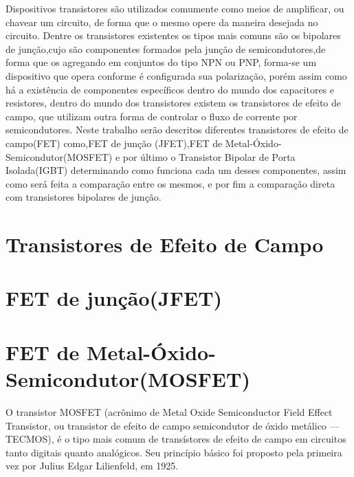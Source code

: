 \documentclass[12pt]{article}
\begin{document}
    Dispositivos transistores são utilizados comumente como meios de amplificar, ou chavear um circuito, de forma que o mesmo opere da maneira desejada no circuito. Dentre os transistores existentes os tipos mais comuns são os bipolares de junção,cujo são componentes formados pela junção de semicondutores,de forma que os agregando em conjuntos do tipo NPN ou PNP, forma-se um dispositivo que opera conforme é configurada sua polarização, porém assim como há a existência de componentes específicos dentro do mundo dos capacitores e resistores, dentro do mundo dos transistores existem os transistores de efeito de campo, que utilizam outra forma de controlar o fluxo de corrente por semicondutores. Neste trabalho serão descritos diferentes transistores de efeito de campo(FET) como,FET de junção (JFET),FET de Metal-Óxido-Semicondutor(MOSFET) e por último o Transistor Bipolar de Porta Isolada(IGBT) determinando como funciona cada um desses componentes, assim como será feita a comparação entre os mesmos, e por fim a comparação direta com transistores bipolares de junção.

\newpage

\section{Transistores de Efeito de Campo}

\section{FET de junção(JFET)}

\section{FET de Metal-Óxido-Semicondutor(MOSFET)}

    O transistor MOSFET (acrônimo de Metal Oxide Semiconductor Field Effect Transistor, ou transistor de efeito de campo semicondutor de óxido metálico — TECMOS), é o tipo mais comum de transístores de efeito de campo em circuitos tanto digitais quanto analógicos. Seu princípio básico foi proposto pela primeira vez por Julius Edgar Lilienfeld, em 1925. 
\end{document}
